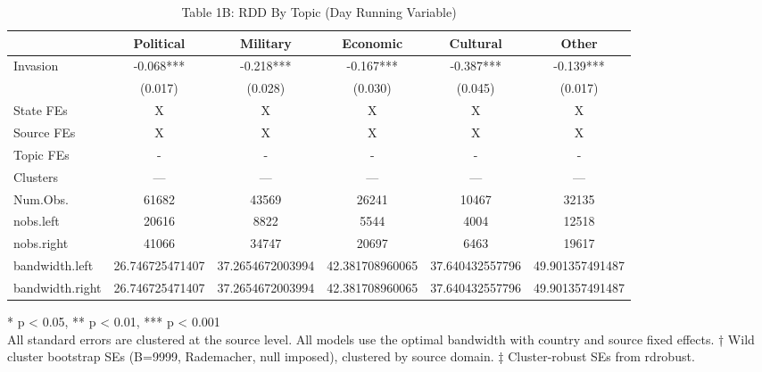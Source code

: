 \begin{table}[!t]
\caption{Table 1B: RDD By Topic (Day Running Variable)} 
\fontsize{12.0pt}{14.4pt}\selectfont
\begin{tabular*}{\linewidth}{@{\extracolsep{\fill}}lccccc}
\toprule
  & Political & Military & Economic & Cultural & Other \\ 
\midrule\addlinespace[2.5pt]
Invasion & -0.068*** & -0.218*** & -0.167*** & -0.387*** & -0.139*** \\ 
{} & {(0.017)} & {(0.028)} & {(0.030)} & {(0.045)} & {(0.017)} \\ 
State FEs & X & X & X & X & X \\ 
Source FEs & X & X & X & X & X \\ 
Topic FEs & - & - & - & - & - \\ 
Clusters & — & — & — & — & — \\ 
Num.Obs. & 61682 & 43569 & 26241 & 10467 & 32135 \\ 
nobs.left & 20616 & 8822 & 5544 & 4004 & 12518 \\ 
nobs.right & 41066 & 34747 & 20697 & 6463 & 19617 \\ 
bandwidth.left & 26.746725471407 & 37.2654672003994 & 42.381708960065 & 37.640432557796 & 49.901357491487 \\ 
bandwidth.right & 26.746725471407 & 37.2654672003994 & 42.381708960065 & 37.640432557796 & 49.901357491487 \\ 
\bottomrule
\end{tabular*}
\begin{minipage}{\linewidth}
* p < 0.05, ** p < 0.01, *** p < 0.001\\
All standard errors are clustered at the source level. All models use the
optimal bandwidth with country and source fixed effects. † Wild cluster
bootstrap SEs (B=9999, Rademacher, null imposed), clustered by source domain. ‡
Cluster-robust SEs from rdrobust.\\
\end{minipage}
\end{table}


